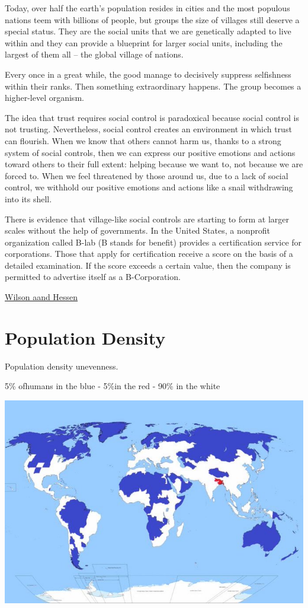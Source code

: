 \documentclass[
]{book}
\begin{document}
Today, over half the earth's population resides in cities and the most populous nations teem with billions of people, but groups the size of villages still deserve a special status. They are the social units that we are genetically adapted to live within and they can provide a blueprint for larger social units, including the largest of them all -- the global village of nations.

Every once in a great while, the good manage to decisively suppress selfishness within their ranks. Then something extraordinary happens. The group becomes a higher-level organism.

The idea that trust requires social control is paradoxical because social control is not trusting. Nevertheless, social control creates an environment in which trust can flourish. When we know that others cannot harm us, thanks to a strong system of social controls, then we can express our positive emotions and actions toward others to their full extent: helping because we want to, not because we are forced to. When we feel threatened by those around us, due to a lack of social control, we withhold our positive emotions and actions like a snail withdrawing into its shell.

There is evidence that village-like social controls are starting to form at larger scales without the help of governments. In the United States, a nonprofit organization called B-lab (B stands for benefit) provides a certification service for corporations. Those that apply for certification receive a score on the basis of a detailed examination. If the score exceeds a certain value, then the company is permitted to advertise itself as a B-Corporation.

\href{https://evonomics.com/norway-toxic-trickle-down-david-sloan-wilson/}{Wilson aand Hessen}

\hypertarget{population-density}{%
\section{Population Density}\label{population-density}}

Population density unevenness.

5\% ofhumans in the blue - 5\%in the red - 90\% in the white

\includegraphics{fig/World_5pct_of_humans_red_blue.jpeg}
\end{document}
